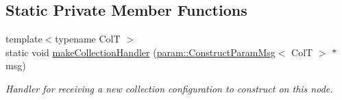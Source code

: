 \subsection*{Static Private Member Functions}
\begin{DoxyCompactItemize}
\item 
{\footnotesize template$<$typename ColT $>$ }\\static void \hyperlink{structvt_1_1vrt_1_1collection_1_1_collection_manager_ab3dfa8b7bac9f519538d4ce97bb99695}{make\+Collection\+Handler} (\hyperlink{structvt_1_1vrt_1_1collection_1_1param_1_1_construct_param_msg}{param\+::\+Construct\+Param\+Msg}$<$ ColT $>$ $\ast$msg)
\begin{DoxyCompactList}\small\item\em Handler for receiving a new collection configuration to construct on this node. \end{DoxyCompactList}\end{DoxyCompactItemize}
